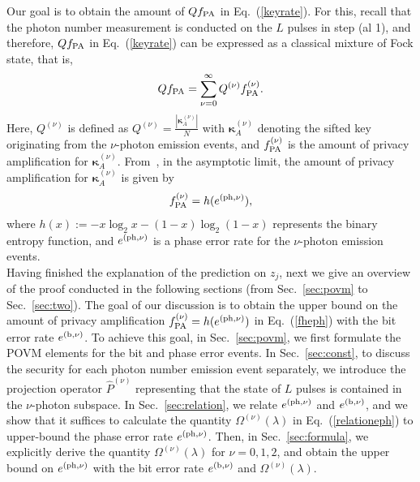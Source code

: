 \documentclass[prl,twocolumn,superscriptaddress,nofootinbib]{revtex4}
\def\U#1{{\rm #1}}
\begin{document}
Our goal is to obtain the amount of $Qf_{\U{PA}}$ in Eq.~(\ref{keyrate}).
  For this, recall that the photon number measurement is conducted on the $L$ pulses in step (al 1),
  and therefore, $Qf_{\U{PA}}$ in Eq.~(\ref{keyrate}) can be expressed as a classical mixture of Fock state, that is, 
  \begin{align}
    Qf_{\U{PA}}=\sum^\infty_{\nu=0}Q^{(\nu)}f^{(\nu)}_{\U{PA}}.
    \label{PAnu}
  \end{align}
  Here, $Q^{(\nu)}$ is defined as $Q^{(\nu)}=\frac{|\bm{\kappa}^{(\nu)}_A|}{N}$
  with $\bm{\kappa}^{(\nu)}_A$ denoting the sifted key originating from the $\nu$-photon emission events, and
  $f^{(\nu)}_{\U{PA}}$ is the amount of privacy amplification for $\bm{\kappa}^{(\nu)}_A$.
  From~\cite{GLLP04,Koashi2009}, in the asymptotic limit, the amount of privacy amplification for $\bm{\kappa}^{(\nu)}_A$ is given by
  \begin{align}
    f^{(\nu)}_{\U{PA}}=h(e^{(\U{ph},\nu)}),
    \label{fheph}
    \end{align}
  where $h(x):=-x\log_2x-(1-x)\log_2(1-x)$ represents the binary entropy function, and
  $e^{(\U{ph},\nu)}$ is a phase error rate for the $\nu$-photon emission events.
\\

Having finished the explanation of the prediction on $z_j$, next we give an overview of the proof conducted in the following sections 
(from Sec.~\ref{sec:povm} to Sec.~\ref{sec:two}). 
The goal of our discussion is to obtain the upper bound on the amount of privacy amplification 
$f^{(\nu)}_{\U{PA}}=h(e^{(\U{ph},\nu)})$ in Eq.~(\ref{fheph}) with the bit error rate $e^{(\U{b},\nu)}$. 
To achieve this goal, in Sec.~\ref{sec:povm}, we first formulate the POVM elements for the bit and phase error events.
In Sec.~\ref{sec:const}, to discuss the security for each photon number emission event separately,
we introduce the projection operator $\hat{P}^{(\nu)}$ representing that the state of $L$ pulses is contained in the
$\nu$-photon subspace.
In Sec.~\ref{sec:relation}, we relate $e^{(\U{ph},\nu)}$ and $e^{(\U{b},\nu)}$, and we show that 
it suffices to calculate the quantity $\Omega^{(\nu)}(\lambda)$ in Eq.~(\ref{relationeph})
to upper-bound the phase error rate $e^{(\U{ph},\nu)}$. 
Then, in Sec.~\ref{sec:formula}, we explicitly derive the quantity $\Omega^{(\nu)}(\lambda)$ for $\nu=0,1,2$, and
obtain the upper bound on $e^{(\U{ph},\nu)}$ with the bit error rate $e^{(\U{b},\nu)}$ and $\Omega^{(\nu)}(\lambda)$. 
  
\end{document}
